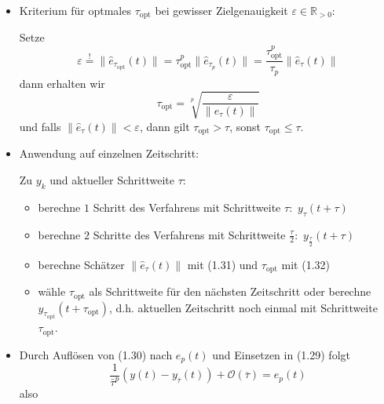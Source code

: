 \documentclass{book}
\newcommand{\assign}{:=}
\newcommand{\tmop}[1]{\ensuremath{\operatorname{#1}}}
\newenvironment{itemizedot}{\begin{itemize} \renewcommand{\labelitemi}{$\bullet$}\renewcommand{\labelitemii}{$\bullet$}\renewcommand{\labelitemiii}{$\bullet$}\renewcommand{\labelitemiv}{$\bullet$}}{\end{itemize}}
\newenvironment{itemizeminus}{\begin{itemize} \renewcommand{\labelitemi}{$-$}\renewcommand{\labelitemii}{$-$}\renewcommand{\labelitemiii}{$-$}\renewcommand{\labelitemiv}{$-$}}{\end{itemize}}
\providecommand{\xequal}[2][]{\mathop{=}\limits_{#1}^{#2}}
\begin{document}
\begin{remark*}
\begin{itemizedot}
    Einsetzen von $e_p (t) = \hat{e}_p (t) + \mathcal{O} (\tau)$ in (1.29)
    ergibt
    \[ y (t) - y_{\tau} (t) = \tau^p e_p (t) +\mathcal{O} (\tau^{p + 1}) =
       \tau^p \hat{e}_p (t) + \mathcal{O} (\tau^{p + 1}) . \]
    {\hspace{1.7em}}Setze noch $\hat{e}_{\tau} (t) \assign \tau^p \hat{e}_p
    (t) = y (t) - y_{\tau} (t) + \mathcal{O} (\tau^{p + 1})$, dann ist
    \begin{equation}
      \hat{e}_{\tau} (t) = \frac{y_{\tau} (t) - y_{\bar{\tau}} (t)}{\left(
      \frac{1}{2^p} - 1 \right)}
    \end{equation}
    ein Sch{\"a}tzer f{\"u}r den Fehler der Ordnung $p + 1$.
    
    \item Kriterium f{\"u}r optmales $\tau_{\tmop{opt}}$ bei gewisser
    Zielgenauigkeit $\varepsilon \in \mathbb{R}_{> 0}$:
    
    Setze
    \[ \varepsilon \xequal{!} \| \hat{e}_{\tau_{\tmop{opt}}} (t) \| =
       \tau^p_{\tmop{opt}} \| \hat{e}_{\tau_p} (t) \| =
       \frac{\tau^p_{\tmop{opt}}}{\tau_p} \| \hat{e}_{\tau} (t) \| \]
    dann erhalten wir
    \begin{equation}
      \tau_{\tmop{opt}} = \sqrt[p]{\frac{\varepsilon}{\| \hat{e}_{\tau} (t)
      \|}}
    \end{equation}
    und falls $\| \hat{e}_{\tau} (t) \| < \varepsilon$, dann gilt
    $\tau_{\tmop{opt}} > \tau$, sonst $\tau_{\tmop{opt}} \leq \tau$.
    
    \item Anwendung auf einzelnen Zeitschritt:
    
    Zu $y_k$ und aktueller Schrittweite $\tau$:
    \begin{itemizeminus}
      \item berechne $1$ Schritt des Verfahrens mit Schrittweite $\tau :$
      $y_{\tau} (t + \tau)$
      
      \item berechne $2$ Schritte des Verfahrens mit Schrittweite
      $\frac{\tau}{2} :$ $y_{\frac{\tau}{2}} (t + \tau)$
      
      \item berechne Sch{\"a}tzer $\| \hat{e}_{\tau} (t) \|$ mit (1.31) und
      $\tau_{\tmop{opt}}$ mit (1.32)
      
      \item w{\"a}hle $\tau_{\tmop{opt}}$ als Schrittweite f{\"u}r den
      n{\"a}chsten Zeitschritt oder berechne $y_{\tau_{\tmop{opt}}} (t +
      \tau_{\tmop{opt}})$, d.h. aktuellen Zeitschritt noch einmal mit
      Schrittweite $\tau_{\tmop{opt}}$.
    \end{itemizeminus}
    \item Durch Aufl{\"o}sen von (1.30) nach $e_p (t)$ und Einsetzen in (1.29)
    folgt
    \[ \frac{1}{\bar{\tau}^p} \left( y (t) - y_{\overline{\tau}} (t) \right)
       + \mathcal{O} \left( \overline{\tau} \right) = e_p (t) \]
    also
    

\end{itemizedot}
\end{remark*}
\end{document}

